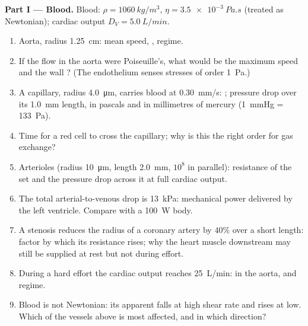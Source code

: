 \begin{problem}
\label{pb:b2:viscous-flows:1}

\medskip
\noindent\textbf{Part I --- Blood.}
Blood: $\rho = \qty{1060}{kg/m^3}$, $\eta = \qty{3.5e-3}{Pa.s}$ (treated as
Newtonian); cardiac output $D_V = \qty{5.0}{L/min}$.
\begin{enumerate}
  \item Aorta, radius \qty{1.25}{cm}: mean speed, , regime.
  \item If the flow in the aorta were Poiseuille's, what would be the
        maximum speed and the wall ? (The endothelium
        senses stresses of order \qty{1}{Pa}.)
  \item A capillary, radius \qty{4.0}{\micro m}, carries blood at
        \qty{0.30}{mm/s}: ; pressure drop over its
        \qty{1.0}{mm} length, in pascals and in millimetres of mercury
        (\qty{1}{mmHg} = \qty{133}{Pa}).
  \item Time for a red cell to cross the capillary; why is this the
        right order for gas exchange?
  \item Arterioles (radius \qty{10}{\micro m}, length \qty{2.0}{mm}, $10^8$
        in parallel): resistance of the set and the pressure drop
        across it at full cardiac output.
  \item The total arterial-to-venous drop is \qty{13}{kPa}: mechanical
        power delivered by the left ventricle. Compare with a
        \qty{100}{W} body.
  \item A stenosis reduces the radius of a coronary artery by $40\%$
        over a short length: factor by which its resistance rises; why
        the heart muscle downstream may still be supplied at rest but
        not during effort.
  \item During a hard effort the cardiac output reaches \qty{25}{L/min}:
         in the aorta, and regime.
  \item Blood is not Newtonian: its apparent  falls at high
        shear rate and rises at low. Which of the vessels above is
        most affected, and in which direction?
\end{enumerate}


\end{problem}
